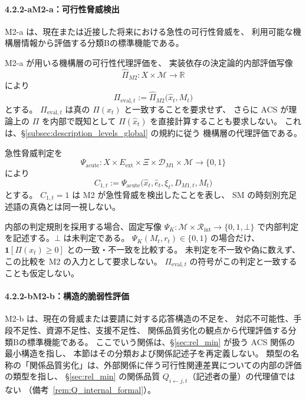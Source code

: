 \paragraph*{4.2.2-a\quad M2-a：可行性脅威検出}

M2-a は、現在または近接した将来における急性の可行性脅威を、
利用可能な機構層情報から評価する分類Bの標準機能である。

\begin{definition}
\label{def:m2a_threat}
M2-a が用いる機構層の可行性代理評価を、
実装依存の決定論的内部評価写像
\[
  \widehat{\Pi}_{M2}:
  X\times\mathcal M
  \to
  \mathbb R
\]
により
\[
  \Pi_{\mathrm{eval},t}
  :=
  \widehat{\Pi}_{M2}
  \bigl(
    \hat x_t,
    M_t
  \bigr)
\]
とする。
$\Pi_{\mathrm{eval},t}$ は真の $\Pi(x_t)$ と一致することを要求せず、
さらに ACS が理論上の $\Pi$ を内部で既知として
$\Pi(\hat x_t)$ を直接計算することも要求しない。
これは、\S\ref{subsec:description_levels_global} の規約に従う
機構層の代理評価である。

急性脅威判定を
\[
  \Psi_{\mathrm{acute}}:
  X\times E_{\mathrm{ext}}\times\Xi\times\mathcal D_{M1}\times\mathcal M
  \to\{0,1\}
\]
により
\[
  C_{1,t}
  :=
  \Psi_{\mathrm{acute}}
  \bigl(
    \hat x_t,\hat e_t,\xi_t,D_{M1,t},M_t
  \bigr)
\]
とする。
$C_{1,t}=1$ は M2 が急性脅威を検出したことを表し、
SM の時刻別充足述語の真偽とは同一視しない。
\end{definition}
\begin{definition}
\label{def:s4_internal_viability_check}
内部の判定規則を採用する場合、固定写像
$\Psi_K:\mathcal M\times\mathcal R_{\mathrm{int}}\to\{0,1,\bot\}$
で内部判定を記述する。$\bot$ は未判定である。
$\Psi_K(M_t,r_t)\in\{0,1\}$ の場合だけ、
$\mathbf1[\Pi(x_t)\ge0]$ との一致・不一致を比較する。
未判定を不一致や偽に数えず、この比較を M2 の入力として要求しない。
$\Pi_{\mathrm{eval},t}$ の符号がこの判定と一致することも仮定しない。
\end{definition}


\paragraph*{4.2.2-b\quad M2-b：構造的脆弱性評価}

M2-b は、現在の脅威または要請に対する応答構造の不足を、
対応不可能性、手段不足性、資源不足性、支援不足性、
関係品質劣化の観点から代理評価する分類Bの標準機能である。
ここでいう関係は、\S\ref{sec:rel_min} が扱う ACS 関係の最小構造を指し、
本節はその分類および関係記述子を再定義しない。
類型の名称の「関係品質劣化」は、外部関係に伴う可行性関連差異についての内部の評価の類型を指し、
\S\ref{sec:rel_min} の関係品質 $Q_{i\leftarrow j,t}$（記述者の量）の代理値ではない
（備考~\ref{rem:Q_internal_formal}）。

